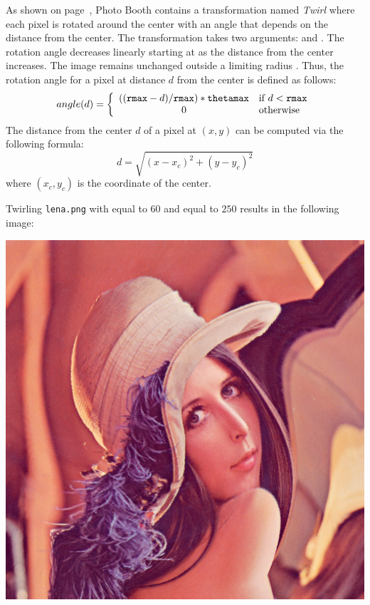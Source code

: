 \documentclass{book}
\begin{document}
\begin{exercise}
As shown on page~\pageref{img:photobooth}, Photo Booth contains a transformation named \emph{Twirl} where each pixel is rotated around the center with an angle that depends on the distance from the center. The transformation takes two arguments:  and . The rotation angle decreases linearly starting at  as the distance from the center increases. The image remains unchanged outside a limiting radius . Thus, the rotation angle for a pixel at distance $d$ from the center is defined as follows: 
$$angle(d) = \left\{\begin{array}{c l}
  ((\mathtt{rmax} - d)/\mathtt{rmax})*\mathtt{thetamax} & \text{if ${d} < \mathtt{rmax}$}\\
  0 & \text{otherwise}\\
\end{array}
\right.$$
The distance from the center $d$ of a pixel at $(x, y)$ can be computed via the following formula:
$$d=\sqrt{(x - x_c)^2 + (y-y_c)^2}$$
where $(x_c, y_c)$ is the coordinate of the center.

Twirling \texttt{lena.png} with  equal to $60$ and  equal to $250$ results in the following image:
\begin{center}
\includegraphics[scale=0.2]{lena-twirled-60.png}
\end{center} 
\end{exercise}
\end{document}
